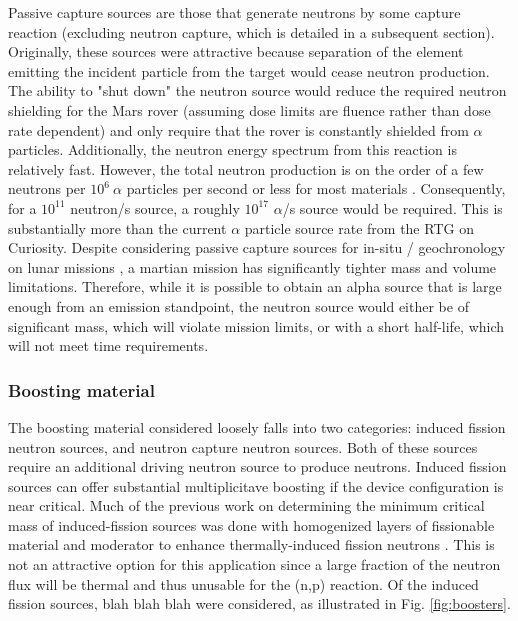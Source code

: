 \documentclass{mc2015}
\begin{document}
Passive capture sources \cite{weise_neutron_1984,jacobs_energy_1983,marsh_high_1995} are those that generate neutrons by some capture reaction (excluding neutron capture, which is detailed in a subsequent section). Originally, these sources were attractive because separation of the element emitting the incident particle from the target would cease neutron production. %
 The ability to "shut down" the neutron source would reduce the required neutron shielding for the Mars rover (assuming dose limits are fluence rather than dose rate dependent) and only require that the rover is constantly shielded from $\alpha$ particles.  Additionally, the neutron energy spectrum from this reaction is relatively fast. %
However, the total neutron production is on the order of a few  neutrons per $10^6\:\alpha$ particles per second or less for most materials \cite{weise_neutron_1984,jacobs_energy_1983}. Consequently, for a $10^{11}$ neutron/s source, a roughly $10^{17}$ $\alpha$/s source would be required. 
This is substantially more than the current $\alpha$ particle source rate from the RTG on Curiosity. Despite considering passive capture sources for in-situ / geochronology on lunar missions \cite{li_evaluation_2011}, a martian mission has significantly tighter mass and volume limitations. Therefore, while it is possible to obtain an alpha source that is large enough from an emission standpoint, the neutron source would either be of significant mass, which will violate mission limits, or with a short half-life, which will not meet time requirements.

\subsubsection{Boosting material}

The boosting material considered loosely falls into two categories: induced fission neutron sources, and neutron capture neutron sources. Both of these sources require an additional driving neutron source to produce neutrons. Induced fission sources can offer substantial multiplicitave boosting if the device configuration is near critical.  Much of the previous work on determining the minimum critical mass of induced-fission sources  was done with homogenized layers of fissionable material and moderator to enhance thermally-induced fission neutrons \cite{karni_semi-automated_keff,karni_smores_2003,goluoglu_smoresnew_2002}. This is not an attractive option for this application since a large fraction of the neutron flux will be thermal and thus unusable for the (n,p) reaction. Of the induced fission sources, blah blah blah were considered, as illustrated in Fig. \ref{fig:boosters}.
\end{document}
